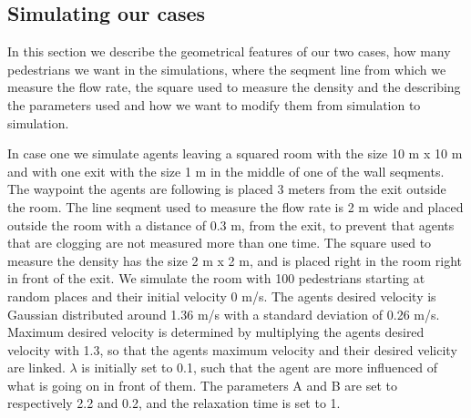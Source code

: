 % 	    
% 	    
% 
% 
\subsection{Simulating our cases}
In this section we describe the geometrical features of our two cases, how many pedestrians we want in the simulations,
where the seqment line from which we measure the flow rate, the square used to measure the density and the describing the 
parameters used and how we want to modify them from simulation to simulation.

In case one we simulate agents leaving a squared room with the size 10 m x 10 m and with one exit with the size 1 m in the middle of
one of the wall seqments. The waypoint the agents are following is placed 3 meters from the exit outside the room.
The line seqment used to measure the flow rate is 2 m wide and placed outside the room with a distance of 0.3 m,
from the exit, to prevent that agents that are clogging are not measured more than one time.
The square used to measure the density has the size 2 m x 2 m, and is placed right in the room right in front of the exit.
We simulate the room with 100 pedestrians starting at random places and their initial velocity 0 m/s.
The agents desired velocity is Gaussian distributed around 1.36 m/s with a standard deviation of 0.26 m/s.
Maximum desired velocity is determined by multiplying the agents desired velocity with 1.3, so that the agents
maximum velocity and their desired velicity are linked.
$\lambda$ is initially set to 0.1, such that the agent are more influenced of what is going on in front of them.
The parameters A and B are set to respectively 2.2 and 0.2, and the relaxation time is set to 1.

